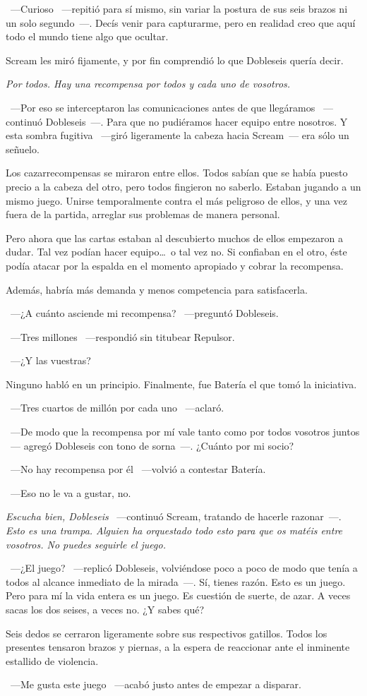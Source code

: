 ~---Curioso ~---repitió para sí mismo, sin variar la postura de sus seis brazos ni un solo segundo~---. Decís venir para capturarme, pero en realidad creo que aquí todo el mundo tiene algo que ocultar.

Scream les miró fijamente, y por fin comprendió lo que Dobleseis quería decir.

\emph{Por todos. Hay una recompensa por todos y cada uno de vosotros.}

~---Por eso se interceptaron las comunicaciones antes de que llegáramos ~---continuó Dobleseis~---. Para que no pudiéramos hacer equipo entre nosotros. Y esta sombra fugitiva ~---giró ligeramente la cabeza hacia Scream~--- era sólo un señuelo.

Los cazarrecompensas se miraron entre ellos. Todos sabían que se había puesto precio a la cabeza del otro, pero todos fingieron no saberlo. Estaban jugando a un mismo juego. Unirse temporalmente contra el más peligroso de ellos, y una vez fuera de la partida, arreglar sus problemas de manera personal.

Pero ahora que las cartas estaban al descubierto muchos de ellos empezaron a dudar. Tal vez podían hacer equipo\dots\ o tal vez no. Si confiaban en el otro, éste podía atacar por la espalda en el momento apropiado y cobrar la recompensa.

Además, habría más demanda y menos competencia para satisfacerla.

~---¿A cuánto asciende mi recompensa? ~---preguntó Dobleseis.

~---Tres millones ~---respondió sin titubear Repulsor.

~---¿Y las vuestras?

Ninguno habló en un principio. Finalmente, fue Batería el que tomó la iniciativa.

~---Tres cuartos de millón por cada uno ~---aclaró.

~---De modo que la recompensa por mí vale tanto como por todos vosotros juntos ~--- agregó Dobleseis con tono de sorna~---. ¿Cuánto por mi socio?

~---No hay recompensa por él ~---volvió a contestar Batería.

~---Eso no le va a gustar, no.

\emph{Escucha bien, Dobleseis} ~---continuó Scream, tratando de hacerle razonar~---. \emph{Esto es una trampa. Alguien ha orquestado todo esto para que os matéis entre vosotros. No puedes seguirle el juego.}

~---¿El juego? ~---replicó Dobleseis, volviéndose poco a poco de modo que tenía a todos al alcance inmediato de la mirada~---. Sí, tienes razón. Esto es un juego. Pero para mí la vida entera es un juego. Es cuestión de suerte, de azar. A veces sacas los dos seises, a veces no. ¿Y sabes qué?

Seis dedos se cerraron ligeramente sobre sus respectivos gatillos. Todos los presentes tensaron brazos y piernas, a la espera de reaccionar ante el inminente estallido de violencia.

~---Me gusta este juego ~---acabó justo antes de empezar a disparar.
